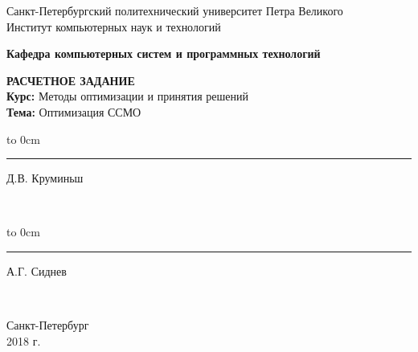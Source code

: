 	\begin{titlepage}
		\begin{center}
			\large {Санкт-Петербургский политехнический университет Петра Великого\\
				Институт компьютерных наук и технологий}\\
		\end{center}
		\begin{center}
			\large\textbf {Кафедра компьютерных систем и программных технологий}
		\end{center}
		\vfill
		\begin{center}
			\large{\textbf{РАСЧЕТНОЕ ЗАДАНИЕ} \\
			\textbf{Курс: } Методы оптимизации и принятия решений\\
			\textbf{Тема: } Оптимизация ССМО}
		\end{center}
		
		\vfill
		
		\hfill\parbox{9 cm}{\hspace*{3cm}\hbox to 0cm{\raisebox{-1em}{\small(подпись)}}\hspace*{-0.8cm}\rule{3cm}{0.8pt} Д.В. Круминьш}\\[0.6cm]
		
		 \hfill\parbox{9 cm}{\hspace*{3cm}\hbox to 0cm{\raisebox{-1em}{\small(подпись)}}\hspace*{-0.8cm}\rule{3cm}{0.8pt} А.Г. Сиднев}\\[0.6cm]
		
		\vspace{\fill}
		\begin{center}
			Санкт-Петербург \\ 2018 г.
		\end{center}
	\end{titlepage}
\setcounter{page}{2}